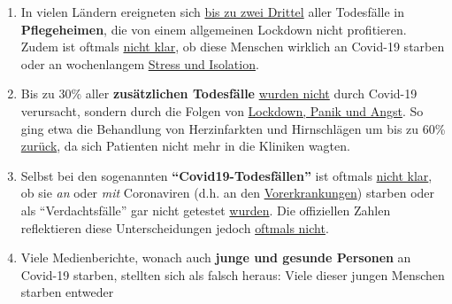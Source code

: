 \begin{enumerate}
{  4\%} der Verstorbenen hatten keine ernsthaften Vorerkrankungen. Das
  Sterbeprofil entspricht damit im Wesentlichen der
  \href{https://www.vienna.at/analyse-zeigt-covid-19-opferkurve-entspricht-normaler-mortalitaet/6581246}{normalen
  Sterblichkeit}.
\item
  In vielen Ländern ereigneten sich
  \href{https://swprs.org/studies-on-covid-19-lethality/\#care-homes}{bis
  zu zwei Drittel} aller Todesfälle in \textbf{Pflegeheimen}, die von
  einem allgemeinen Lockdown nicht profitieren. Zudem ist oftmals
  \href{https://www.hsj.co.uk/commissioning/thousands-of-extra-deaths-outside-hospital-not-attributed-to-covid-19/7027459.article}{nicht
  klar}, ob diese Menschen wirklich an Covid-19 starben oder an
  wochenlangem
  \href{https://www.theguardian.com/world/2020/jun/05/covid-19-causing-10000-dementia-deaths-beyond-infections-research-says}{Stress
  und Isolation}.
\item
  Bis zu 30\% aller \textbf{zusätzlichen Todesfälle}
  \href{https://www.ons.gov.uk/peoplepopulationandcommunity/birthsdeathsandmarriages/deaths/articles/analysisofdeathregistrationsnotinvolvingcoronaviruscovid19englandandwales28december2019to1may2020/technicalannex}{wurden
  nicht} durch Covid-19 verursacht, sondern durch die Folgen von
  \href{https://www.telegraph.co.uk/global-health/science-and-disease/two-new-waves-deaths-break-nhs-new-analysis-warns/}{Lockdown,
  Panik und Angst}. So ging etwa die Behandlung von Herzinfarkten und
  Hirnschlägen um bis zu 60\%
  \href{https://www.nytimes.com/2020/04/06/well/live/coronavirus-doctors-hospitals-emergency-care-heart-attack-stroke.html}{zurück},
  da sich Patienten nicht mehr in die Kliniken wagten.
\item
  Selbst bei den sogenannten \textbf{``Covid19-Todesfällen''} ist
  oftmals
  \href{https://spectator.us/understand-report-figures-covid-deaths/}{nicht
  klar}, ob sie \emph{an} oder \emph{mit} Coronaviren (d.h. an den
  \href{https://www.morgenpost.de/vermischtes/article228994571/Rechtsmediziner-Alle-Corona-Toten-hatten-Vorerkrankungen.html}{Vorerkrankungen})
  starben oder als ``Verdachtsfälle'' gar nicht getestet
  \href{https://www.youtube.com/watch?v=V0lIWZpiRU0}{wurden}. Die
  offiziellen Zahlen reflektieren diese Unterscheidungen jedoch
  \href{https://swprs.org/rki-relativiert-corona-todesfaelle/}{oftmals
  nicht}.
\item
  Viele Medienberichte, wonach auch \textbf{junge und gesunde Personen}
  an Covid-19 starben, stellten sich als falsch heraus: Viele dieser
  jungen Menschen starben entweder

\end{enumerate}

